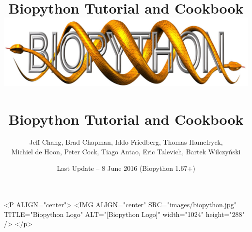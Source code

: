 \documentclass{report}
\begin{document}
\begin{htmlonly}
\title{Biopython Tutorial and Cookbook}
\end{htmlonly}
\begin{latexonly}
\title{
\includegraphics[width=\textwidth]{images/biopython.jpg}\\
~\\
Biopython Tutorial and Cookbook}
\end{latexonly}

\author{Jeff Chang, Brad Chapman, Iddo Friedberg, Thomas Hamelryck, \\
Michiel de Hoon, Peter Cock, Tiago Antao, Eric Talevich, Bartek Wilczy\'{n}ski}
\date{Last Update -- 8 June 2016 (Biopython 1.67+)}

\begin{rawhtml}
<P ALIGN="center">
<IMG ALIGN="center" SRC="images/biopython.jpg" TITLE="Biopython Logo" ALT="[Biopython Logo]" width="1024" height="288" />
</p>
\end{rawhtml}

\maketitle
\tableofcontents






\end{document}
